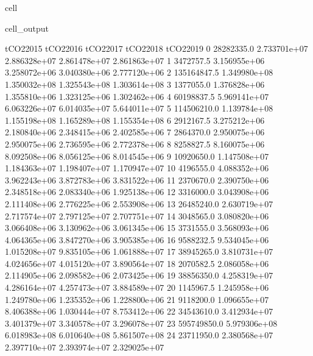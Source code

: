 \documentclass[letterpaper,10pt,english]{jupyterBook}
\begin{document}
\begin{sphinxuseclass}{cell}
\begin{sphinxVerbatimOutput}
\begin{sphinxuseclass}{cell_output}
\begin{sphinxVerbatim}[commandchars=\\\{\}]
      tCO2\PYGZus{}2015     tCO2\PYGZus{}2016     tCO2\PYGZus{}2017     tCO2\PYGZus{}2018     tCO2\PYGZus{}2019  \PYGZbs{}
0    28282335.0  2.733701e+07  2.886328e+07  2.861478e+07  2.861863e+07   
1     3472757.5  3.156955e+06  3.258072e+06  3.040380e+06  2.777120e+06   
2   135164847.5  1.349980e+08  1.350032e+08  1.325543e+08  1.303614e+08   
3     1377055.0  1.376828e+06  1.355810e+06  1.323125e+06  1.302462e+06   
4    60198837.5  5.969141e+07  6.063226e+07  6.014035e+07  5.644011e+07   
5   114506210.0  1.139784e+08  1.155198e+08  1.165289e+08  1.155354e+08   
6     2912167.5  3.275212e+06  2.180840e+06  2.348415e+06  2.402585e+06   
7     2864370.0  2.950075e+06  2.950075e+06  2.736595e+06  2.772378e+06   
8     8258827.5  8.160075e+06  8.092508e+06  8.056125e+06  8.014545e+06   
9    10920650.0  1.147508e+07  1.184363e+07  1.198407e+07  1.170947e+07   
10    4196555.0  4.088352e+06  3.962243e+06  3.872783e+06  3.831522e+06   
11    2370670.0  2.390750e+06  2.348518e+06  2.083340e+06  1.925138e+06   
12    3316000.0  3.043908e+06  2.111408e+06  2.776225e+06  2.553908e+06   
13   26485240.0  2.630719e+07  2.717574e+07  2.797125e+07  2.707751e+07   
14    3048565.0  3.080820e+06  3.066408e+06  3.130962e+06  3.061345e+06   
15    3731555.0  3.568093e+06  4.064365e+06  3.847270e+06  3.905385e+06   
16    9588232.5  9.534045e+06  1.015208e+07  9.835105e+06  1.061888e+07   
17   38945265.0  3.810731e+07  4.024656e+07  4.015120e+07  3.890564e+07   
18    2070582.5  2.086058e+06  2.114905e+06  2.098582e+06  2.073425e+06   
19   38856350.0  4.258319e+07  4.286164e+07  4.257473e+07  3.884589e+07   
20    1145967.5  1.245958e+06  1.249780e+06  1.235352e+06  1.228800e+06   
21    9118200.0  1.096655e+07  8.406388e+06  1.030444e+07  8.753412e+06   
22   34543610.0  3.412934e+07  3.401379e+07  3.340578e+07  3.296078e+07   
23  595749850.0  5.979306e+08  6.018983e+08  6.010640e+08  5.861507e+08   
24   23711950.0  2.380568e+07  2.397710e+07  2.393974e+07  2.329025e+07   


\end{sphinxVerbatim}
\end{sphinxuseclass}
\end{sphinxVerbatimOutput}
\end{sphinxuseclass}
\end{document}
